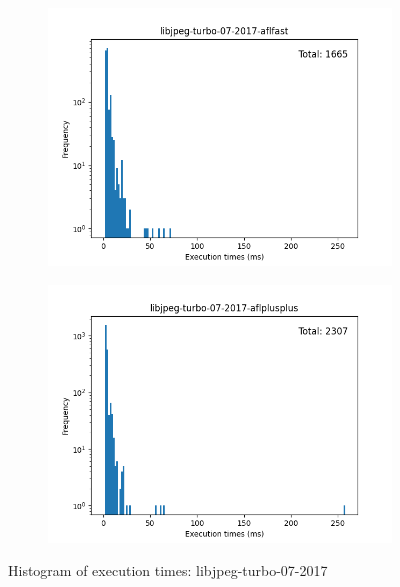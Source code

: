 \begin{figure}
    \begin{subfigure}[t]{0.475\textwidth}
        \centering
        \includegraphics[width=\textwidth]{Experiments/execs/libjpeg-turbo-07-2017-aflfast.png}
        \caption{}
        \label{fig:sub:libjpeg-hist-aflfast}
    \end{subfigure}
    \hfill
    \begin{subfigure}[t]{0.475\textwidth}
        \centering
        \includegraphics[width=\textwidth]{Experiments/execs/libjpeg-turbo-07-2017-aflplusplus.png}
        \caption{}
        \label{fig:sub:libjpeg-hist-aflplusplus}
    \end{subfigure}

    \caption{Histogram of execution times: libjpeg-turbo-07-2017}
    \label{Figure:exe-libjpeg}
\end{figure}

